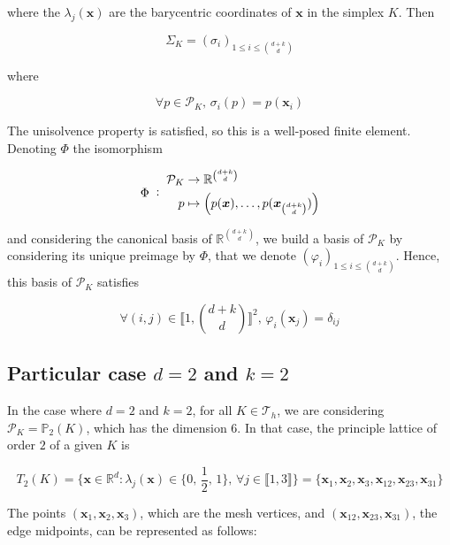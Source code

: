 \documentclass{article}
\theoremstyle{definition}
\theoremstyle{proposition}
\theoremstyle{theorem}
\theoremstyle{remark}
\theoremstyle{corollary}  %
\theoremstyle{exercise}
\theoremstyle{lemma}
\begin{document}
where the $\lambda_j(\bm x)$ are the barycentric coordinates of $\bm x$ in the simplex $K$. Then 

$$\Sigma_K = (\sigma_i)_{1\leq i \leq \binom{d+k}{d}}$$

where 

$$\forall p \in \mathcal{P}_K, \, \sigma_i(p) = p(\bm x_i)$$

The unisolvence property is satisfied, so this is a well-posed finite element. Denoting $\Phi$ the isomorphism

\[
\vcenter{\hbox{$\Phi$}}
\;:\;
\begin{aligned}
\mathcal{P}_K &\to \mathbb{R}^{\binom{d+k}{d}} \\
p &\mapsto \left(p(\bm x), \dots, p(\bm x_{\binom{d+k}{d}})\right)
\end{aligned}
\]

and considering the canonical basis of $\mathbb{R}^{\binom{d+k}{d}}$, we build a basis of $\mathcal{P}_K$ by considering its unique preimage by $\Phi$, that we denote $(\varphi_i)_{1\leq i \leq \binom{d+k}{d}}$. Hence, this basis of $\mathcal{P}_K$ satisfies 

$$\forall (i, j) \in \llbracket 1, \binom{d+k}{d} \rrbracket^2, \, \varphi_i(\bm x_j) = \delta_{ij}$$

\subsection{Particular case $d=2$ and $k=2$}

In the case where $d=2$ and $k=2$, for all $K \in \mathcal{T}_h$, we are considering $\mathcal{P}_K = \mathbb P_2(K)$, which has the dimension $6$. In that case, the principle lattice of order $2$ of a given $K$ is 

$$T_2(K) = \Big\{\bm x\in \mathbb{R}^d: \lambda_j(\bm x) \in \{0, \, \frac{1}{2}, \, 1\}, \, \forall j \in \llbracket 1, 3\rrbracket\Big\} = \{\bm x_1, \bm x_2, \bm x_3, \bm x_{12}, \bm x_{23}, \bm x_{31}\}$$

The points $(\bm x_1, \bm x_2, \bm x_3)$, which are the mesh vertices, and $(\bm x_{12}, \bm x_{23}, \bm x_{31})$, the edge midpoints, can be represented as follows:
\end{document}
